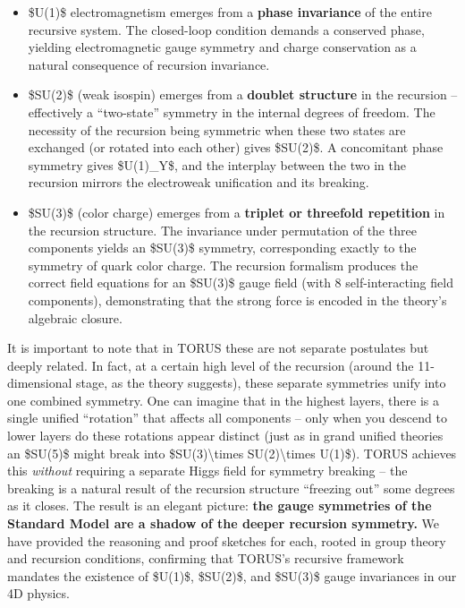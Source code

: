 \documentclass[
]{article}
\begin{document}
{\begin{itemize}
\item
  \$U(1)\$ electromagnetism emerges from a \textbf{phase invariance} of
  the entire recursive system. The closed-loop condition demands a
  conserved phase, yielding electromagnetic gauge symmetry and charge
  conservation as a natural consequence of recursion invariance.
\item
  \$SU(2)\$ (weak isospin) emerges from a \textbf{doublet structure} in
  the recursion -- effectively a ``two-state'' symmetry in the internal
  degrees of freedom\hspace{0pt}. The necessity of the recursion being
  symmetric when these two states are exchanged (or rotated into each
  other) gives \$SU(2)\$. A concomitant phase symmetry gives
  \$U(1)\_Y\$, and the interplay between the two in the recursion
  mirrors the electroweak unification and its breaking\hspace{0pt}.
\item
  \$SU(3)\$ (color charge) emerges from a \textbf{triplet or threefold
  repetition} in the recursion structure\hspace{0pt}. The invariance
  under permutation of the three components yields an \$SU(3)\$
  symmetry, corresponding exactly to the symmetry of quark color charge.
  The recursion formalism produces the correct field equations for an
  \$SU(3)\$ gauge field (with 8 self-interacting field components),
  demonstrating that the strong force is encoded in the theory's
  algebraic closure\hspace{0pt}.
\end{itemize}

It is important to note that in TORUS these are not separate postulates
but deeply related. In fact, at a certain high level of the recursion
(around the 11-dimensional stage, as the theory suggests), these
separate symmetries unify into one combined symmetry\hspace{0pt}. One
can imagine that in the highest layers, there is a single unified
``rotation'' that affects all components -- only when you descend to
lower layers do these rotations appear distinct (just as in grand
unified theories an \$SU(5)\$ might break into
\$SU(3)\textbackslash times SU(2)\textbackslash times U(1)\$). TORUS
achieves this \emph{without} requiring a separate Higgs field for
symmetry breaking -- the breaking is a natural result of the recursion
structure ``freezing out'' some degrees as it closes\hspace{0pt}. The
result is an elegant picture: \textbf{the gauge symmetries of the
Standard Model are a shadow of the deeper recursion symmetry.} We have
provided the reasoning and proof sketches for each, rooted in group
theory and recursion conditions, confirming that TORUS's recursive
framework mandates the existence of \$U(1)\$, \$SU(2)\$, and \$SU(3)\$
gauge invariances in our 4D physics.

}
\end{document}
